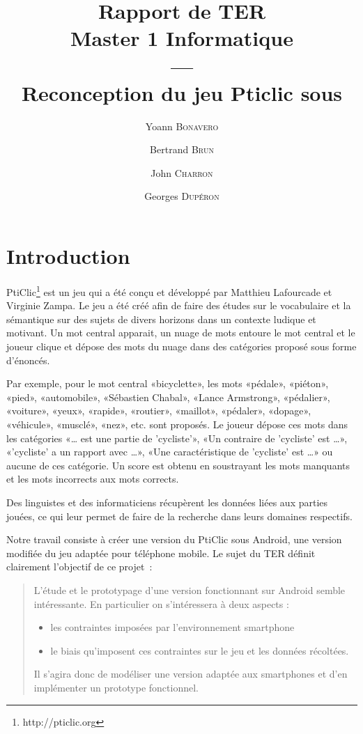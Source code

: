 \documentclass[a4paper,11pt,french]{article}
\title{Rapport de TER
\\Master 1 Informatique
\\---\\
Reconception du jeu Pticlic sous \android{}}
\author{Yoann \textsc{Bonavero} \and Bertrand \textsc{Brun} \and John \textsc{Charron} \and Georges \textsc{Dupéron}}
\def\android{Android\texttrademark{}}
\begin{document}
\maketitle


\pagestyle{empty}
\thispagestyle{empty}

\tableofcontents


\pagestyle{empty}
\thispagestyle{empty}
\newpage
\setcounter{page}{1}
\pagestyle{plain}

\section{Introduction}

PtiClic\footnote{http://pticlic.org} est un jeu qui a été conçu et développé par Matthieu Lafourcade et Virginie Zampa. Le jeu a été créé afin de faire des études sur le vocabulaire et la sémantique sur des sujets de divers horizons dans un contexte ludique et motivant. Un mot central apparait, un nuage de mots entoure le mot central et le joueur clique et dépose des mots du nuage dans des catégories proposé sous forme d'énoncés. 

Par exemple, pour le mot central «bicyclette», les mots «pédale», «piéton», «pied», «automobile», «Sébastien Chabal», «Lance Armstrong», «pédalier», «voiture», «yeux», «rapide», «routier», «maillot», «pédaler», «dopage», «véhicule», «musclé», «nez», etc. sont proposés. Le joueur dépose ces mots dans les catégories «\dots{} est une partie de 'cycliste'», «Un contraire de 'cycliste' est \dots{}», «'cycliste' a un rapport avec \dots{}»,  «Une caractéristique de 'cycliste' est \dots{}» ou aucune de ces catégorie. Un score est obtenu en soustrayant les mots manquants et les mots incorrects aux mots corrects. 

Des linguistes et des informaticiens récupèrent les données liées aux parties jouées, ce qui leur permet de faire de la recherche dans leurs domaines respectifs.

Notre travail consiste à créer une version du PtiClic sous \android{}, une version modifiée du jeu adaptée pour téléphone mobile. Le sujet du TER définit clairement l'objectif de ce projet~:

\begin{quotation}
  L'étude et le prototypage d'une version fonctionnant sur \android{} semble intéressante. En particulier on s'intéressera à deux aspects :
  \begin{itemize}
  \item les contraintes imposées par l'environnement smartphone
  \item le biais qu'imposent ces contraintes sur le jeu et les données récoltées.
  \end{itemize}
  
  Il s'agira donc de modéliser une version adaptée aux smartphones et d'en implémenter un prototype fonctionnel.
\end{quotation}
\end{document}
